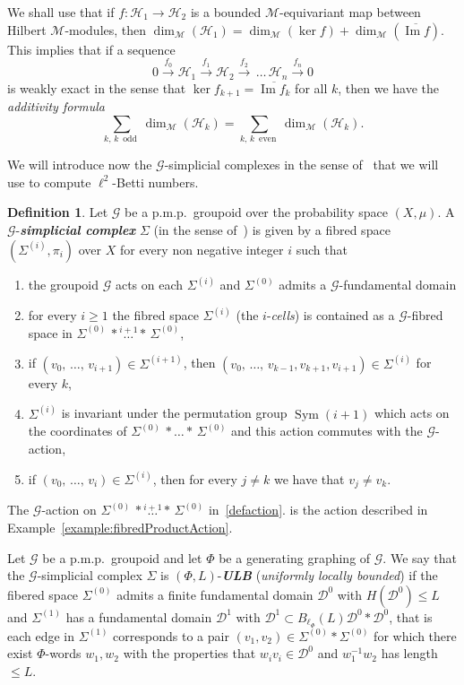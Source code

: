 \documentclass[10pt]{amsart}
\theoremstyle{definition}
\newtheorem{defi}[cdrthm]{Definition}
\newcommand{\defin}[1]{\textbf{\emph{#1}}}
\newcommand{\cM}{\mathcal{M}}
\newcommand{\cH}{\mathcal{H}}
\newcommand{\cg}{\mathcal{G}}
\newcommand{\cd}{\mathcal{D}}
\DeclareMathOperator{\Ima}{Im}
\DeclareMathOperator{\Sym}{Sym}
\newcommand{\pmp}{p.m.p.\ }
\begin{document}
We shall use that if $f \colon \cH_1 \to \cH_2$ is a bounded $\cM$-equivariant map between Hilbert $\cM$-modules, then $\dim_\cM(\cH_1)= \dim_\cM(\ker f) + \dim_\cM(\overline{\Ima f})$. This implies that if a sequence
\[
0 \xrightarrow{f_0} \cH_1 \xrightarrow{f_1} \cH_2 \xrightarrow{f_2}\,\dots\,\cH_n \xrightarrow{f_n} 0
\]
is weakly exact in the sense that $\ker f_{k+1} = \overline{\Ima f_k}$ for all $k$, then we have the \emph{additivity formula}
\[
\sum_{k,\,k\,\text{ odd }} \dim_\cM(\cH_k) = \sum_{k,\,k \,\text{ even }} \dim_\cM(\cH_k).
\]

We will introduce now the $\cg$-simplicial complexes in the sense of~\cite{gab_ihes} that we will use to compute $\ell^2$-Betti numbers.

\begin{defi}\label{def:gsimplicial}
Let $\cg$ be a \pmp groupoid over the probability space $(X,\mu)$. A $\cg$-\defin{simplicial complex} $\Sigma$ (in the sense of~\cite{gab_ihes}) is given by a fibred space $(\Sigma^{(i)}, \pi_i)$ over $X$ for every non negative integer $i$ such that
\begin{enumerate}
\item \label{defaction}
the groupoid $\cg$ acts on each $\Sigma^{(i)}$ and $\Sigma^{(0)}$ admits a $\cg$-fundamental domain

\item\label{item:subfibred}
for every $i\geq 1$ the fibred space $\Sigma^{(i)}$ (the $i$-\emph{cells}) is contained as a $\cg$-fibred space in $\Sigma^{(0)}\,*\stackrel{i+1}{\ldots}*\,\Sigma^{(0)}$,

\item\label{defboundary}
if $(v_0,\,\ldots,\,v_{i+1})\in\Sigma^{(i+1)}$, then $(v_0,\,\ldots,\,v_{k-1},v_{k+1},v_{i+1})\in\Sigma^{(i)}$ for every $k$,

\item\label{defi5.1.4} $\Sigma^{(i)}$ is invariant under the permutation group $\Sym(i+1)$ which acts on the coordinates of $\Sigma^{(0)}\,*\ldots*\,\Sigma^{(0)}$ and this action commutes with the $\cg$-action,

\item\label{defi5.1.5} if $(v_0,\,\ldots,\,v_{i})\in\Sigma^{(i)}$, then for every $j\neq k$ we have that $v_j\neq v_k$.
\end{enumerate}
The $\cg$-action on $\Sigma^{(0)}\,*\stackrel{i+1}{\ldots}*\,\Sigma^{(0)}$ in~\eqref{defaction}. is the action described in Example~\ref{example:fibredProductAction}.

Let $\cg$ be a \pmp groupoid and let $\Phi$ be a generating graphing of $\cg$. We say that the $\cg$-simplicial complex $\Sigma$ is $(\Phi,L)$-\defin{ULB} (\emph{uniformly locally bounded}) if the fibered space $\Sigma^{(0)}$ admits a finite fundamental domain $\cd^0$ with $H(\cd^0)\leq L$ and $\Sigma^{(1)}$ has a fundamental domain $\cd^1$ with $\cd^1\subset B_{\ell_\Phi}(L)\cd^0*\cd^0$, that is each edge in $\Sigma^{(1)}$ corresponds to a pair $(v_1,v_2)\in \Sigma^{(0)}*\Sigma^{(0)}$ for which there exist $\Phi$-words $w_1, w_2$ with the properties that $w_iv_i\in \cd^0$ and $w_1^{-1}w_2$ has length $\leq L$.
\end{defi}
\end{document}
